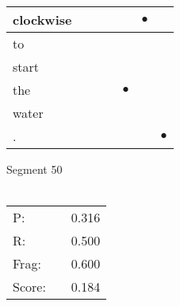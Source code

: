 \documentclass[landscape]{article}
\newcommand{\ssp}{\hspace{2pt}}
\newcommand{\mex}{\cellcolor{g}$\bullet$}
\begin{document}
\begin{tabular}{|l|p{10pt}|p{10pt}|p{10pt}|p{10pt}|p{10pt}|p{10pt}|}
\hline
\ssp \cellcolor{ref4}clockwise \ssp&\hspace{2pt}&\hspace{2pt}&\hspace{2pt}&\hspace{2pt}&\hspace{2pt}\mex&\hspace{2pt}\\
\hline
\ssp to \ssp&\hspace{2pt}&\hspace{2pt}&\hspace{2pt}&\hspace{2pt}&\hspace{2pt}&\hspace{2pt}\\
\hline
\ssp start \ssp&\hspace{2pt}&\hspace{2pt}&\hspace{2pt}&\hspace{2pt}&\hspace{2pt}&\hspace{2pt}\\
\hline
\ssp \cellcolor{ref3}the \ssp&\hspace{2pt}&\hspace{2pt}&\hspace{2pt}&\hspace{2pt}\mex&\hspace{2pt}&\hspace{2pt}\\
\hline
\ssp water \ssp&\hspace{2pt}&\hspace{2pt}&\hspace{2pt}&\hspace{2pt}&\hspace{2pt}&\hspace{2pt}\\
\hline
\ssp \cellcolor{ref5}. \ssp&\hspace{2pt}&\hspace{2pt}&\hspace{2pt}&\hspace{2pt}&\hspace{2pt}&\hspace{2pt}\mex\\
\hline
\end{tabular}

\vspace{6pt}
\noindent Segment 50\\\\
\noindent\begin{tabular}{lm{12pt}r}
\hline
P:&&0.316\\
R:&&0.500\\
Frag:&&0.600\\
Score:&&0.184\\
\end{tabular}
\end{document}
